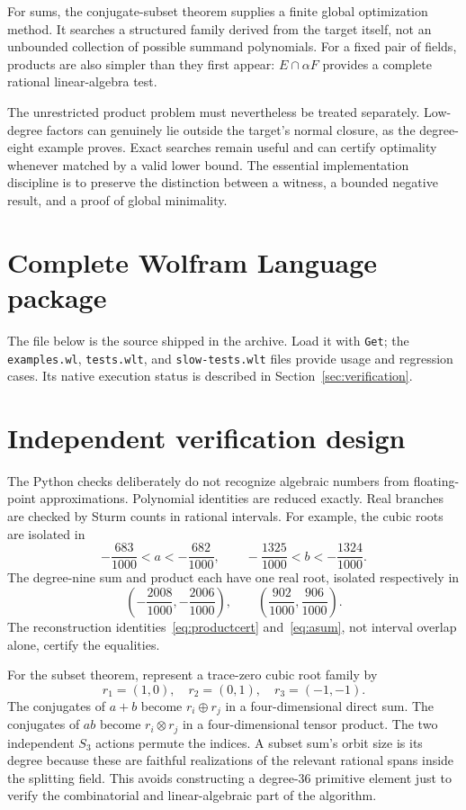 \documentclass[11pt,letterpaper]{article}
\theoremstyle{definition}\newtheorem{definition}[theorem]{Definition}
\theoremstyle{remark}\newtheorem{remark}[theorem]{Remark}
\newcommand{\WL}[1]{\texttt{#1}}
\begin{document}
For sums, the conjugate-subset theorem supplies a finite global optimization method. It searches a structured family derived from the target itself, not an unbounded collection of possible summand polynomials. For a fixed pair of fields, products are also simpler than they first appear: $E\cap\alpha F$ provides a complete rational linear-algebra test.

The unrestricted product problem must nevertheless be treated separately. Low-degree factors can genuinely lie outside the target's normal closure, as the degree-eight example proves. Exact searches remain useful and can certify optimality whenever matched by a valid lower bound. The essential implementation discipline is to preserve the distinction between a witness, a bounded negative result, and a proof of global minimality.

\clearpage
\appendix
\section{Complete Wolfram Language package}
\label{app:code}
The file below is the source shipped in the archive. Load it with \WL{Get}; the \WL{examples.wl}, \WL{tests.wlt}, and \WL{slow-tests.wlt} files provide usage and regression cases. Its native execution status is described in Section~\ref{sec:verification}.


\section{Independent verification design}
The Python checks deliberately do not recognize algebraic numbers from floating-point approximations. Polynomial identities are reduced exactly. Real branches are checked by Sturm counts in rational intervals. For example, the cubic roots are isolated in
\[
 -\frac{683}{1000}<a<-\frac{682}{1000},\qquad
 -\frac{1325}{1000}<b<-\frac{1324}{1000}.
\]
The degree-nine sum and product each have one real root, isolated respectively in
\[
 \left(-\frac{2008}{1000},-\frac{2006}{1000}\right),\qquad
 \left(\frac{902}{1000},\frac{906}{1000}\right).
\]
The reconstruction identities~\eqref{eq:productcert} and~\eqref{eq:asum}, not interval overlap alone, certify the equalities.

For the subset theorem, represent a trace-zero cubic root family by
\[
 r_1=(1,0),\quad r_2=(0,1),\quad r_3=(-1,-1).
\]
The conjugates of $a+b$ become $r_i\oplus r_j$ in a four-dimensional direct sum. The conjugates of $ab$ become $r_i\otimes r_j$ in a four-dimensional tensor product. The two independent $S_3$ actions permute the indices. A subset sum's orbit size is its degree because these are faithful realizations of the relevant rational spans inside the splitting field. This avoids constructing a degree-$36$ primitive element just to verify the combinatorial and linear-algebraic part of the algorithm.
\end{document}
